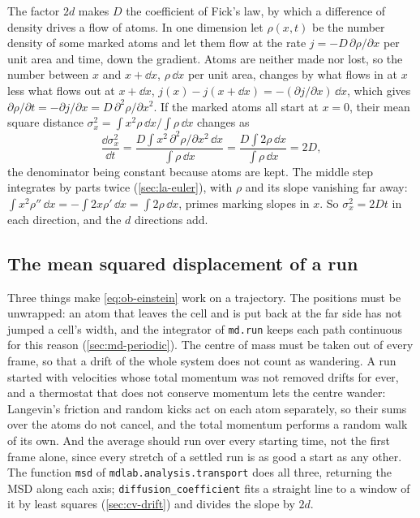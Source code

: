 The factor $2d$ makes $D$ the coefficient of Fick's law, by which a
difference of density drives a flow of atoms. In one dimension let
$\rho(x, t)$ be the number density of some marked atoms and let them
flow at the rate $j = -D\,\partial\rho/\partial x$ per unit area and
time, down the gradient. Atoms are neither made nor lost, so the number
between $x$ and $x + \dd x$, $\rho\,\dd x$ per unit area, changes by
what flows in at $x$ less what flows out at $x + \dd x$, $j(x) - j(x +
\dd x) = -(\partial j/\partial x)\,\dd x$, which gives $\partial\rho/\partial
t = -\partial j/\partial x = D\,\partial^2\rho/\partial x^2$. If the marked
atoms all start at $x = 0$, their mean square distance $\sigma_x^2 = \int
x^2\rho\,\dd x\big/\int\rho\,\dd x$ changes as
\begin{equation*}
   \frac{\dd\sigma_x^2}{\dd t}
   = \frac{D\int x^2\,\partial^2\rho/\partial x^2\,\dd x}{\int\rho\,\dd x}
   = \frac{D\int 2\rho\,\dd x}{\int\rho\,\dd x} = 2D ,
\end{equation*}
the denominator being constant because atoms are kept. The middle step
integrates by parts twice (\cref{sec:la-euler}), with $\rho$ and its slope
vanishing far away: $\int x^2\rho''\,\dd x = -\int 2x\rho'\,\dd x = \int
2\rho\,\dd x$, primes marking slopes in $x$. So $\sigma_x^2 = 2Dt$ in each
direction, and the $d$ directions add.

\subsection*{The mean squared displacement of a run}

Three things make \cref{eq:ob-einstein} work on a trajectory. The
positions must be unwrapped: an atom that leaves the cell and is put back
at the far side has not jumped a cell's width, and the integrator of
\texttt{md.run} keeps each path continuous for this reason
(\cref{sec:md-periodic}). The centre of mass must be taken out of every
frame, so that a drift of the whole system does not count as wandering.
A run started with velocities whose total momentum was not removed drifts
for ever, and a thermostat that does not conserve momentum lets the
centre wander: Langevin's friction and random kicks act on each atom
separately, so their sums over the atoms do not cancel, and the total
momentum performs a random walk of its own. And the average should run over every starting time, not
the first frame alone, since every stretch of a settled run is as good a
start as any other. The function \texttt{msd} of
\texttt{mdlab.analysis.transport} does all three, returning the MSD along
each axis; \texttt{diffusion\_coefficient} fits a straight line to a
window of it by least squares (\cref{sec:cv-drift}) and divides the slope
by $2d$.

